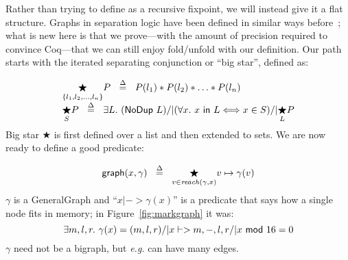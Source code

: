 Rather than trying to define  as a recursive fixpoint, we will instead give it a flat structure.  Graphs in separation logic have been defined in similar ways before~\cite{ilya-graphs}; what is new here is that we prove---with the amount of precision required to convince Coq---that we can still enjoy fold/unfold with our definition.  Our path starts with the iterated separating conjunction or ``big star'', defined as:
\iftrue
\[
\begin{array}{@{}l@{}}
\underset{\{l_1, l_2,\dots,l_n\}}{\bigstar}P ~~ \defeq ~~ P(l_1) *
  P(l_2) * \dots * P(l_n) \\
\underset{S}{\bigstar} P ~~ \defeq ~~ \exists L.~ (\p{NoDup}\ L) /| (\forall x.~ x\ \p{in}\ L <=> x \in S) /| \underset{L}{\bigstar}P
\end{array}
\]
Big star $\bigstar$ is first defined over a list and then extended to sets.  We are now ready to define a good  predicate:
\fi
\iffalse
\begin{equation*}
  \underset{\{l_1, l_2,\dots,l_n\}}{\bigstar}P ~~ \defeq ~~ P(l_1) *
  P(l_2) * \dots * P(l_n).
\end{equation*}
Formally $\bigstar$ is defined over a list rather than a set and is parameterized by a predicate $P$.  It is natural to extend $\bigstar$ to a set $S$ with an existentially-quantified duplicate-free list~$L$:
\[
\underset{S}{\bigstar} P ~~ \defeq ~~ \exists L.~ (\p{NoDup}\ L) /| (\forall x.~ x\ \p{in}\ L <=> x \in S) /| \underset{L}{\bigstar}P
\]
We use the same $\bigstar$ notation since the concepts are similar, but the existential adds a little pain since we need to prove that all choices of $L$ yield equivalent predicates.

We are now ready to give a good \p{graph} predicate:
\fi
\vspace{-1.5ex}
\begin{equation}\label{eqn:iter_def}
  \p{graph}(x, \gamma) ~~ \defeq ~~ \underset{v \in \mathit{reach}(\gamma, x)}{\bigstar} v\mapsto\gamma(v)
\vspace{-1.5ex}
\end{equation}
$\gamma$ is a GeneralGraph and ``$x |-> \gamma(x)$'' is a predicate that says how a single node fits in memory; in Figure~\ref{fig:markgraph} it was:
\[
\exists m,l,r.~\gamma(x) = (m,l,r) /| x |-> m,-,l,r /| x\ \mathsf{mod}\ 16 = 0
\]
$\gamma$ need not be a bigraph, but \emph{e.g.} can have many edges.


